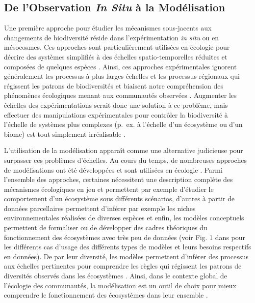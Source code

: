 \begin{refsection}
\clearpage

\hypertarget{de-lobservation-in-situ-uxe0-la-moduxe9lisation}{%
\section{\texorpdfstring{De l'Observation \emph{In Situ} à la
Modélisation}{De l'Observation In Situ à la Modélisation}}\label{de-lobservation-in-situ-uxe0-la-moduxe9lisation}}

Une première approche pour étudier les mécanismes sous-jacents aux
changements de biodiversité réside dans l'expérimentation \emph{in situ}
ou en mésocosmes. Ces approches sont particulièrement utilisées en
écologie pour décrire des systèmes simplifiés à des échelles
spatio-temporelles réduites et composées de quelques espèces
\autocite{Witman_2015}. Ainsi, ces approches expérimentales ignorent
généralement les processus à plus larges échelles et les processus
régionaux qui régissent les patrons de biodiversités et biaisent notre
compréhension des phénomènes écologiques menant aux communautés
observées \autocite{Leibold_2017}. Augmenter les échelles des
expérimentations serait donc une solution à ce problème, mais effectuer
des manipulations expérimentales pour contrôler la biodiversité à
l'échelle de systèmes plus complexes (p.~ex. à l'échelle d'un écosystème
ou d'un biome) est tout simplement irréalisable
\autocite{Petersen2009_intro}.

L'utilisation de la modélisation apparaît comme une alternative
judicieuse pour surpasser ces problèmes d'échelles. Au cours du temps,
de nombreuses approches de modélisations ont été développées et sont
utilisées en écologie \autocite{Geary_2020}. Parmi l'ensemble des
approches, certaines nécessitent une description complète des mécanismes
écologiques en jeu et permettent par exemple d'étudier le comportement
d'un écosystème sous différents scénarios, d'autres à partir de données
parcellaires permettent d'inférer par exemple les niches
environnementales réalisées de diverses espèces et enfin, les modèles
conceptuels permettent de formaliser ou de développer des cadres
théoriques du fonctionnement des écosystèmes avec très peu de données
(voir Fig. 1 dans \textcite{Geary_2020} pour les différents cas d'usage
des différents types de modèles et leurs besoins respectifs en données).
De par leur diversité, les modèles permettent d'inférer des processus
aux échelles pertinentes pour comprendre les règles qui régissent les
patrons de diversités observés dans les écosystèmes
\autocite{Leibold_2017}. Ainsi, dans le contexte global de l'écologie
des communautés, la modélisation est un outil de choix pour mieux
comprendre le fonctionnement des écosystèmes dans leur ensemble
\autocite{Edgar_2016}.


\end{refsection}

